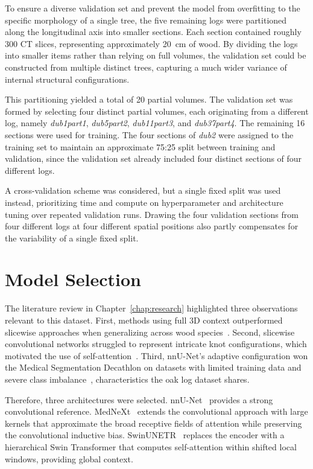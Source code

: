 To ensure a diverse validation set and prevent the model from overfitting to the specific morphology of a single tree, the five remaining logs were partitioned along the longitudinal axis into smaller sections. Each section contained roughly 300 CT slices, representing approximately 20~cm of wood. By dividing the logs into smaller items rather than relying on full volumes, the validation set could be constructed from multiple distinct trees, capturing a much wider variance of internal structural configurations.

This partitioning yielded a total of 20 partial volumes. The validation set was formed by selecting four distinct partial volumes, each originating from a different log, namely \textit{dub1part1}, \textit{dub5part2}, \textit{dub11part3}, and \textit{dub37part4}. The remaining 16 sections were used for training. The four sections of \textit{dub2} were assigned to the training set to maintain an approximate 75:25 split between training and validation, since the validation set already included four distinct sections of four different logs.

A cross-validation scheme was considered, but a single fixed split was used instead, prioritizing time and compute on hyperparameter and architecture tuning over repeated validation runs. Drawing the four validation sections from four different logs at four different spatial positions also partly compensates for the variability of a single fixed split.

\section{Model Selection}

The literature review in Chapter~\ref{chap:research} highlighted three observations relevant to this dataset. First, methods using full 3D context outperformed slicewise approaches when generalizing across wood species~\cite{Schmoldt_1998}. Second, slicewise convolutional networks struggled to represent intricate knot configurations, which motivated the use of self-attention~\cite{khazem2023deep}. Third, nnU-Net's adaptive configuration won the Medical Segmentation Decathlon on datasets with limited training data and severe class imbalance~\cite{isensee2021nnunet, antonelli2022msd}, characteristics the oak log dataset shares.

Therefore, three architectures were selected. nnU-Net~\cite{isensee2021nnunet} provides a strong convolutional reference. MedNeXt~\cite{roy2023mednext} extends the convolutional approach with large kernels that approximate the broad receptive fields of attention while preserving the convolutional inductive bias. SwinUNETR~\cite{hatamizadeh2022swinunetr} replaces the encoder with a hierarchical Swin Transformer that computes self-attention within shifted local windows, providing global context.


